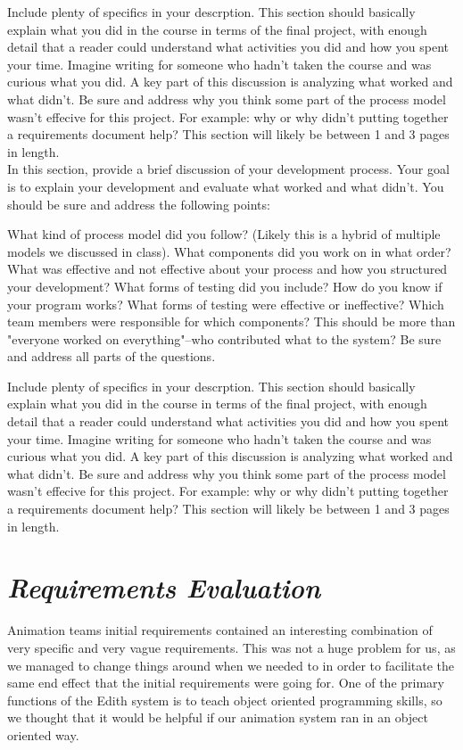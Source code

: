 \documentclass[12pt]{article}
\begin{document}
Include plenty of specifics in your descrption. This section should basically explain what you did in the course in terms of the final project, with enough detail that a reader could understand what activities you did and how you spent your time. Imagine writing for someone who hadn't taken the course and was curious what you did.
A key part of this discussion is analyzing what worked and what didn't. Be sure and address why you think some part of the process model wasn't effecive for this project. For example: why or why didn't putting together a requirements document help?
This section will likely be between 1 and 3 pages in length.\\ 

In this section, provide a brief discussion of your development process. Your goal is to explain your development and evaluate what worked and what didn't. You should be sure and address the following points:

What kind of process model did you follow? (Likely this is a hybrid of multiple models we discussed in class). What components did you work on in what order? What was effective and not effective about your process and how you structured your development?
What forms of testing did you include? How do you know if your program works? What forms of testing were effective or ineffective?
Which team members were responsible for which components? This should be more than "everyone worked on everything"--who contributed what to the system?
Be sure and address all parts of the questions.

Include plenty of specifics in your descrption. This section should basically explain what you did in the course in terms of the final project, with enough detail that a reader could understand what activities you did and how you spent your time. Imagine writing for someone who hadn't taken the course and was curious what you did.
A key part of this discussion is analyzing what worked and what didn't. Be sure and address why you think some part of the process model wasn't effecive for this project. For example: why or why didn't putting together a requirements document help?
This section will likely be between 1 and 3 pages in length.\\ 


\section{\emph{Requirements Evaluation}}
Animation teams initial requirements contained an interesting combination of very specific and very vague requirements. This was not a huge problem for us, as we managed to change things around when we needed to in order to facilitate the same end effect that the initial requirements were going for. One of the primary functions of the Edith system is to teach object oriented programming skills, so we thought that it would be helpful if our animation system ran in an object oriented way. \\
\end{document}
